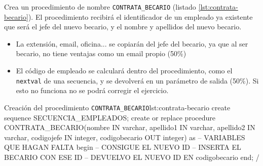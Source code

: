 \begin{homeworkProblem}
  Crea un procedimiento de nombre \texttt{CONTRATA\_BECARIO} (listado \ref{lst:contrata-becario}). El procedimiento recibirá el identificador de un empleado ya existente que será el jefe del nuevo becario, y el nombre y apellidos del nuevo becario.
  \begin{itemize}
  \item La extensión, email, oficina... se copiarán del jefe del becario, ya que al ser becario, no tiene ventajas como un email propio (50\%)
  \item El código de empleado se calculará dentro del procedimiento, como el \texttt{nextval} de una secuencia, y se devolverá en un parámetro de salida (50\%). Si esto no funciona no se podrá corregir el ejercicio.
  \end{itemize}

  \begin{listadosql}{Creación del procedimiento \texttt{CONTRATA\_BECARIO}}{lst:contrata-becario}
create sequence SECUENCIA_EMPLEADOS;
create or replace procedure CONTRATA_BECARIO(nombre IN varchar, apellido1 IN varchar, apellido2 IN varchar, codigojefe IN integer, codigobecario OUT integer)
as 
  -- VARIABLES QUE HAGAN FALTA
begin
  -- CONSIGUE EL NUEVO ID 
  -- INSERTA EL BECARIO CON ESE ID
  -- DEVUELVO EL NUEVO ID EN codigobecario
end;
/
\end{listadosql}

\end{homeworkProblem}

